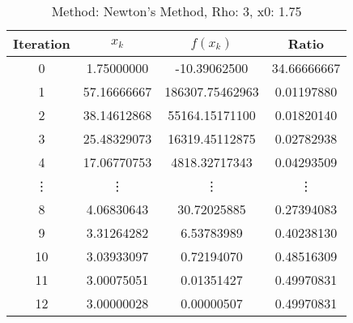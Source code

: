 \begin{table}
\centering
\caption{Method: Newton's Method, Rho: 3, x0: 1.75}
\label{tab:table_Newton's_Method_3_1_75}
\begin{tabular}{c c c c}
\toprule
Iteration &       $x_k$ &        $f(x_k)$ &       Ratio \\
\midrule
        0 &  1.75000000 &    -10.39062500 & 34.66666667 \\
        1 & 57.16666667 & 186307.75462963 &  0.01197880 \\
        2 & 38.14612868 &  55164.15171100 &  0.01820140 \\
        3 & 25.48329073 &  16319.45112875 &  0.02782938 \\
        4 & 17.06770753 &   4818.32717343 &  0.04293509 \\
   \vdots &      \vdots &          \vdots &      \vdots \\
        8 &  4.06830643 &     30.72025885 &  0.27394083 \\
        9 &  3.31264282 &      6.53783989 &  0.40238130 \\
       10 &  3.03933097 &      0.72194070 &  0.48516309 \\
       11 &  3.00075051 &      0.01351427 &  0.49970831 \\
       12 &  3.00000028 &      0.00000507 &  0.49970831 \\
\bottomrule
\end{tabular}
\end{table}
